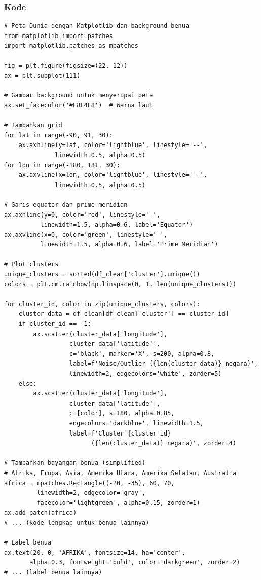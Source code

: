 \documentclass[12pt,a4paper]{article}
\begin{document}
\subsubsection{Kode}
\begin{lstlisting}[style=pythonstyle]
# Peta Dunia dengan Matplotlib dan background benua
from matplotlib import patches
import matplotlib.patches as mpatches

fig = plt.figure(figsize=(22, 12))
ax = plt.subplot(111)

# Gambar background untuk menyerupai peta
ax.set_facecolor('#E8F4F8')  # Warna laut

# Tambahkan grid
for lat in range(-90, 91, 30):
    ax.axhline(y=lat, color='lightblue', linestyle='--', 
              linewidth=0.5, alpha=0.5)
for lon in range(-180, 181, 30):
    ax.axvline(x=lon, color='lightblue', linestyle='--', 
              linewidth=0.5, alpha=0.5)

# Garis equator dan prime meridian
ax.axhline(y=0, color='red', linestyle='-', 
          linewidth=1.5, alpha=0.6, label='Equator')
ax.axvline(x=0, color='green', linestyle='-', 
          linewidth=1.5, alpha=0.6, label='Prime Meridian')

# Plot clusters
unique_clusters = sorted(df_clean['cluster'].unique())
colors = plt.cm.rainbow(np.linspace(0, 1, len(unique_clusters)))

for cluster_id, color in zip(unique_clusters, colors):
    cluster_data = df_clean[df_clean['cluster'] == cluster_id]
    if cluster_id == -1:
        ax.scatter(cluster_data['longitude'], 
                  cluster_data['latitude'],
                  c='black', marker='X', s=200, alpha=0.8,
                  label=f'Noise/Outlier ({len(cluster_data)} negara)', 
                  linewidth=2, edgecolors='white', zorder=5)
    else:
        ax.scatter(cluster_data['longitude'], 
                  cluster_data['latitude'],
                  c=[color], s=180, alpha=0.85, 
                  edgecolors='darkblue', linewidth=1.5,
                  label=f'Cluster {cluster_id} 
                        ({len(cluster_data)} negara)', zorder=4)

# Tambahkan bayangan benua (simplified)
# Afrika, Eropa, Asia, Amerika Utara, Amerika Selatan, Australia
africa = mpatches.Rectangle((-20, -35), 60, 70, 
         linewidth=2, edgecolor='gray', 
         facecolor='lightgreen', alpha=0.15, zorder=1)
ax.add_patch(africa)
# ... (kode lengkap untuk benua lainnya)

# Label benua
ax.text(20, 0, 'AFRIKA', fontsize=14, ha='center', 
       alpha=0.3, fontweight='bold', color='darkgreen', zorder=2)
# ... (label benua lainnya)


\end{lstlisting}
\end{document}
